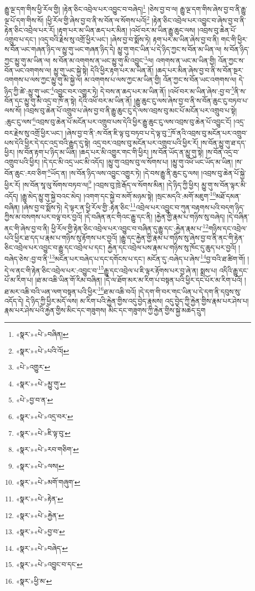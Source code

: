 རྒྱུ་ལྔ་དག་གིས་ཕྱི་རོལ་གྱི། །རྟེན་ཅིང་འབྲེལ་པར་འབྱུང་བ་བཞེད།\footnote{«སྣར་»«པེ་»བཞིན།} །ཅེས་བྱ་བ་ལ། རྒྱུ་ལྔ་དག་གིས་ཞེས་བྱ་བ་ནི་རྒྱུ་ལྔ་པོ་དག་གིས་སོ། །ཕྱི་རོལ་གྱི་ཞེས་བྱ་བ་ནི་ས་བོན་ལ་སོགས་པའོ།\footnote{«སྣར་»«པེ་»པའི་འོ།} །རྟེན་ཅིང་འབྲེལ་པར་འབྱུང་བ་ཞེས་བྱ་བ་ནི་རྟེན་ཅིང་འབྲེལ་པར་རོ། །རྟག་པར་མ་ཡིན་ཆད་པར་མིན། །འཕོ་བར་མ་ཡིན་རྒྱུ་ཆུང་ལས། །འབྲས་བུ་ཆེན་པོ་འགྲུབ་པ་དང་། །འདྲ་བའི་རྗེས་སུ་འགྲོ་ཕྱིར་ཡང་། །ཞེས་བྱ་བ་སྨོས་ཏེ། རྟག་པར་མ་ཡིན་ཞེས་བྱ་བ་ནི། གང་གི་ཕྱིར་ས་བོན་ཡང་གཞན་ཉིད་ལ་མྱུ་གུ་ཡང་གཞན་ཉིད་དེ། མྱུ་གུ་གང་ཡིན་པ་དེ་ཉིད་ཀྱང་ས་བོན་མ་ཡིན་ལ། ས་བོན་ཉིད་ཀྱང་མྱུ་གུ་མ་ཡིན་ལ། ས་བོན་མ་འགགས་ན་ཡང་མྱུ་གུ་མི་འབྱུང་\footnote{«པེ་»འགྱུར་}ལ། འགགས་ན་ཡང་མ་ཡིན་གྱི། འོན་ཀྱང་ས་བོན་ཡང་འགགས་ལ། མྱུ་གུ་ཡང་སྐྱེ་སྟེ། དེའི་ཕྱིར་རྟག་པར་མ་ཡིན་ནོ། །ཆད་པར་མིན་ཞེས་བྱ་བ་ནི་ས་བོན་སྔར་འགགས་པ་ལས་ཀྱང་མྱུ་གུ་མི་སྐྱེ་ལ། མ་འགགས་པ་ལས་ཀྱང་མ་ཡིན་གྱི། འོན་ཀྱང་ས་བོན་ཡང་འགགས་ལ། དེ་ཉིད་ཀྱི་ཚེ་:མྱུ་གུ་ཡང་\footnote{«སྣར་»«པེ་»མྱུ་གུ་}འབྱུང་བར་འགྱུར་ཏེ། དེ་བས་ན་ཆད་པར་མ་ཡིན་ནོ། །འཕོ་བར་མ་ཡིན་ཞེས་:བྱ་བ་\footnote{«པེ་»བྱ་བ་ན་}ནི་ས་བོན་དང་མྱུ་གུ་མི་འདྲ་བ་ཁོ་ན་སྟེ། དེའི་འཕོ་བར་མ་ཡིན་ནོ། །རྒྱུ་ཆུང་ངུ་ལས་ཞེས་བྱ་བ་ནི་ས་བོན་ཆུང་ངུ་བཏབ་པ་ལས་སོ། །འབྲས་བུ་ཆེན་པོ་འགྲུབ་པ་ཞེས་བྱ་བ་ནི་རྒྱུ་ཆུང་ངུ་དེ་ལས་འབྲས་བུ་མང་པོ་མངོན་པར་འགྲུབ་པ་སྟེ། :ཆུང་ངུ་ལས་\footnote{«སྣར་»«པེ་»འདྲ་བར་}འབྲས་བུ་ཆེན་པོ་མངོན་པར་འགྲུབ་པས་དེའི་ཕྱིར་རྒྱུ་ཆུང་ངུ་ལས་འབྲས་བུ་ཆེན་པོ་འབྱུང་ངོ། །འདྲ་བར་རྗེས་སུ་འགྲོ་ཕྱིར་ཡང་། །ཞེས་བྱ་བ་ནི་:ས་བོན་ཇི་ལྟ་བུ་བཏབ་པ་དེ་ལྟ་བུ་\footnote{«སྣར་»«པེ་»ཇི་ལྟ་བུ་}ཁོ་ནའི་འབྲས་བུ་མངོན་པར་འགྲུབ་པས་དེའི་ཕྱིར་དེ་དང་འདྲ་བའི་རྒྱུད་དུ་སྟེ། འདྲ་བར་འབྲས་བུ་མངོན་པར་འགྲུབ་པའི་ཕྱིར་རོ། །ས་བོན་མྱུ་གུ་ཐ་དད་ཕྱིར། །ས་བོན་རྟག་པ་ཉིད་མ་ཡིན། །ཆད་པར་མི་འགྱུར་གང་གི་ཕྱིར། །ས་བོན་ཡོད་ན་མྱུ་གུ་སྟེ། །ས་བོན་འདྲ་བ་འགྲུབ་པའི་ཕྱིར། །དེ་དང་མི་འདྲ་ཡང་མི་འདོད། །མྱུ་གུ་འབྲས་བུ་ལ་སོགས་པ། །མྱུ་གུ་འཕོ་ཡང་ཡོད་མ་ཡིན། །ས་བོན་ཆུང་:རབ་ཅིག་\footnote{«སྣར་»«པེ་»རབ་གཅིག་}ཡོད་ན། །ས་བོན་ཉིད་ལས་འབྱུང་འགྱུར་ཏེ། །དེ་བས་རྒྱུ་ནི་ཆུང་ངུ་ལས། །འབྲས་བུ་ཆེན་པོ་སྐྱེ་ཕྱིར་རོ། །ས་བོན་སཱ་ལུ་སོགས་བཏབ་ལ།\footnote{«སྣར་»«པེ་»ལས།} །འབྲས་བུ་ཁྲེ་རྒོད་ལ་སོགས་མིན། །དེ་ཉིད་ཀྱི་ཕྱིར། མྱུ་གུ་ས་བོན་ལྟར་མི་འདོད། །རྒྱུ་མེད་མྱུ་གུ་སྐྱེ་བའང་མེད། །འགག་དང་སྐྱེ་བ་མགོ་མཉམ་སྟེ། །སྲང་མདའི་:མགོ་མཇུག་\footnote{«སྣར་»«པེ་»མགོ་གཞུག་}མཐོ་དམན་བཞིན། །ཞེས་བྱ་བ་སྨོས་ཏེ། དེ་ལྟར་ན་ཕྱི་རོལ་གྱི་:རྟེན་ཅིང་\footnote{«སྣར་»«པེ་»རྟེན་}འབྲེལ་པར་འབྱུང་བ་ཀུན་བརྟགས་པའི་བདག་ཉིད་ཀྱིས་མ་བསགས་པར་བལྟ་བར་བྱའོ། །དེ་བཞིན་ནང་གིའང་རྒྱུ་དང་ནི། །རྐྱེན་གྱི་རྣམ་པ་གཉིས་སུ་བཞེད། །དེ་བཞིན་ནང་གི་ཞེས་བྱ་བ་ནི། ཕྱི་རོལ་གྱི་རྟེན་ཅིང་འབྲེལ་པར་འབྱུང་བ་བཞིན་དུ་རྒྱུ་དང་:རྐྱེན་རྣམ་པ་\footnote{«སྣར་»«པེ་»རྐྱེན་}གཉིས་དང་འབྲེལ་པའི་ཕྱིར་ཐ་དད་པ་རྣམ་པ་གཉིས་སུ་རྟོགས་པར་བྱའོ། །རྒྱུ་དང་རྐྱེན་གྱི་རྣམ་པ་གཉིས་སུ་ཞེས་བྱ་བ་ནི་ནང་གི་རྟེན་ཅིང་འབྲེལ་པར་འབྱུང་བ་རྒྱུ་དང་འབྲེལ་པ་དང་། རྐྱེན་དང་འབྲེལ་པས་རྣམ་པ་གཉིས་སུ་ཁོང་དུ་ཆུད་པར་བྱའོ། །བཞེད་ཅེས་:བྱ་བ་ནི་\footnote{«སྣར་»«པེ་»བྱ་བ་}མངོན་པར་བཞེད་པ་དང་དགོངས་པ་དང་། མངོན་དུ་:བཞེད་པ་ཞེས་\footnote{«སྣར་»«པེ་»བཞེད་}བྱ་བའི་ཐ་ཚིག་གོ། །དེ་ལ་ནང་གི་རྟེན་ཅིང་འབྲེལ་པར་:འབྱུང་བ་\footnote{«སྣར་»«པེ་»འབྱུང་བ་དང་}རྒྱུ་དང་འབྲེལ་པ་ཇི་ལྟར་རྟོགས་པར་བྱ་ཞེ་ན། སྨྲས་པ། འདིའི་རྒྱུ་དང་པོ་མ་རིག་པ། །ཐ་མ་འཆི་ཡིན་གོ་རིམ་བཞིན། །དེ་ལ་ཐོག་མར་མ་རིག་པ་བསྟན་པའི་ཕྱིར་དང་པོར་མ་རིག་པའོ། །ཐ་མར་འཆི་བའི་ཡན་ལག་བསྟན་པའི་ཕྱིར་\footnote{«སྣར་»ཕྱི་མ་}ཐ་མ་འཆི་བའོ། །དེ་དག་གི་བར་གང་ཡིན་པ་དེ་དག་ནི་དབུས་སུ་འདོད་དེ། དེ་ཉིད་ཀྱི་ཕྱིར་མདོ་ལས། མ་རིག་པའི་རྐྱེན་གྱིས་འདུ་བྱེད་རྣམས། འདུ་བྱེད་ཀྱི་རྐྱེན་གྱིས་རྣམ་པར་ཤེས་པ། རྣམ་པར་ཤེས་པའི་རྐྱེན་གྱིས་མིང་དང་གཟུགས། མིང་དང་གཟུགས་ཀྱི་རྐྱེན་གྱིས་སྐྱེ་མཆེད་དྲུག 